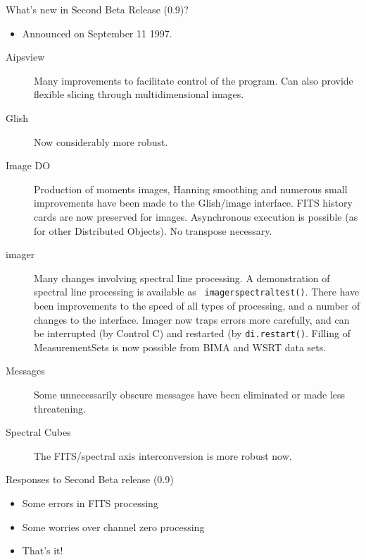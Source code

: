 \begin{slide}{What's new in Second Beta Release (0.9)?}

\begin{itemize}
\item Announced on September 11 1997. 
\end{itemize}
\begin{description}
\item[Aipsview] Many improvements to facilitate control of the
     program. Can also provide flexible slicing through multidimensional
     images.  
\item[Glish] Now considerably more robust. 
\item[Image DO] Production of moments images, Hanning smoothing and 
numerous small improvements have been made to the Glish/image
interface. FITS history cards are now preserved for
images. Asynchronous execution is possible (as for other Distributed
Objects). No transpose necessary.
\item[imager] Many changes involving spectral line processing.
A demonstration of spectral line processing is available as {\tt
imagerspectraltest()}. There have been improvements to the speed of
all types of processing, and a number of changes to the
interface. Imager now traps errors more carefully, and can be
interrupted (by Control C) and restarted (by {\tt di.restart()}.
Filling of MeasurementSets is now possible from BIMA and WSRT
data sets.
\item[Messages] Some unnecessarily obscure messages have been eliminated
or made less threatening.
\item[Spectral Cubes] The FITS/spectral axis interconversion is more
robust now.  
\end{description}
\end{slide}

\begin{slide}{Responses to Second Beta release (0.9)}

\begin{itemize}
\item Some errors in FITS processing
\item Some worries over channel zero processing
\item That's it!
\end{itemize}
\end{slide}


